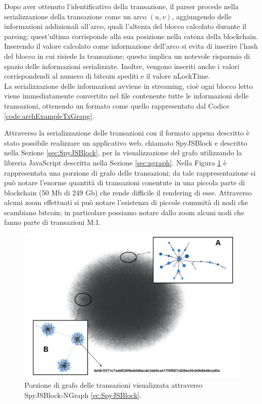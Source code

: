 \begin{example}
Dopo aver ottenuto l'identificativo della transazione, il parser procede nella serializzazione della transazione come un arco $(u, v)$, aggiungendo delle informazioni addizionali all'arco, quali  l'altezza del blocco calcolato durante il parsing; quest'ultima corrisponde alla sua posizione nella catena della blockchain.
Inserendo il valore calcolato come informazione dell'arco si evita di inserire l'hash del blocco in cui risiede la transazione; questo implica un notevole risparmio di spazio delle informazioni serializzate. Inoltre, vengono inseriti anche i valori corrispondendi al numero di bitcoin spediti e il valore nLockTime.\\
La serializzazione delle informazioni avviene in streaming, cioè ogni blocco letto viene immediatamente convertito nel file contenente tutte le informazioni delle transazioni, ottenendo un formato come quello rappresentato dal Codice \ref{code:archExampleTxGrapg}.\\



\end{example}

Attraverso la serializzazione delle transazioni con il formato appena descritto è stato possibile realizzare un applicativo web, chiamato SpyJSBlock e descritto nella Sezione \ref{sec:SpyJSBlock}, per la visualizzazione del grafo utilizzando la libreria JavaScript descritta nella Sezione \ref{sec:ngraph}. Nella Figura \ref{fig:visgraphTx} è rappresentata una porzione di grafo delle transazioni; da tale rappresentazione si può notare  l'enorme quantità di transazioni conentute in una piccola parte di blockchain (50 Mb di 249 Gb) che rende difficile il rendering di esse.
Attraverso alcuni zoom effettuati si può notare l'esistenza di piccole comunità di nodi che scambiano bitcoin; in particolare possiamo notare dallo zoom  alcuni nodi che fanno parte di transazioni M:1.

\begin{figure}
\centering
\includegraphics[scale=0.3]{images/demo/graph_tx_demo_presentation.png}
\caption{Porzione di grafo delle transazioni visualizzata attraverso SpyJSBlock-NGraph \ref{ec:SpyJSBlock}.}
\label{fig:visgraphTx}
\end{figure}


